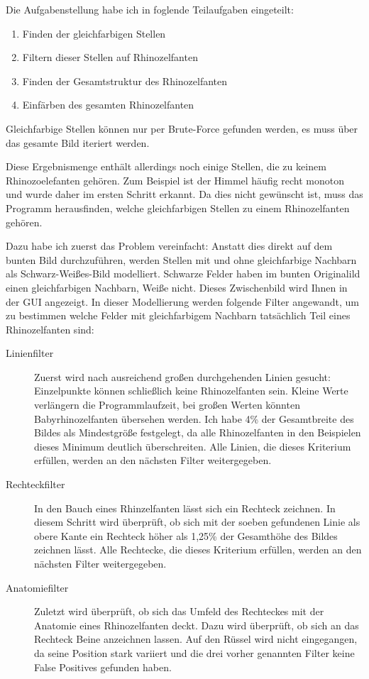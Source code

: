 Die Aufgabenstellung habe ich in foglende Teilaufgaben eingeteilt:
\begin{enumerate}
	\item Finden der gleichfarbigen Stellen
	\item Filtern dieser Stellen auf Rhinozelfanten
	\item Finden der Gesamtstruktur des Rhinozelfanten
	\item Einfärben des gesamten Rhinozelfanten
\end{enumerate}

Gleichfarbige Stellen können nur per Brute-Force gefunden werden, es muss über das gesamte Bild iteriert werden.

Diese Ergebnismenge enthält allerdings noch einige Stellen, die zu keinem Rhinozoelefanten gehören. Zum Beispiel ist der Himmel häufig recht monoton und wurde daher im ersten Schritt erkannt. Da dies nicht gewünscht ist, muss das Programm herausfinden, welche gleichfarbigen Stellen zu einem Rhinozelfanten gehören.

Dazu habe ich zuerst das Problem vereinfacht: Anstatt dies direkt auf dem bunten Bild durchzuführen, werden Stellen mit und ohne gleichfarbige Nachbarn als Schwarz-Weißes-Bild modelliert. Schwarze Felder haben im bunten Originalild einen gleichfarbigen Nachbarn, Weiße nicht. Dieses Zwischenbild wird Ihnen in der GUI angezeigt. In dieser Modellierung werden folgende Filter angewandt, um zu bestimmen welche Felder mit gleichfarbigem Nachbarn tatsächlich Teil eines Rhinozelfanten sind:

\begin{description}
	\item[Linienfilter] Zuerst wird nach ausreichend großen durchgehenden Linien gesucht: Einzelpunkte können schließlich keine Rhinozelfanten sein. Kleine Werte verlängern die Programmlaufzeit, bei großen Werten könnten Babyrhinozelfanten übersehen werden. Ich habe 4\% der Gesamtbreite des Bildes als Mindestgröße festgelegt, da alle Rhinozelfanten in den Beispielen dieses Minimum deutlich überschreiten. Alle Linien, die dieses Kriterium erfüllen, werden an den nächsten Filter weitergegeben.
	\item[Rechteckfilter] In den Bauch eines Rhinzelfanten lässt sich ein Rechteck zeichnen. In diesem Schritt wird überprüft, ob sich mit der soeben gefundenen Linie als obere Kante ein Rechteck höher als 1,25\% der Gesamthöhe des Bildes zeichnen lässt. Alle Rechtecke, die dieses Kriterium erfüllen, werden an den nächsten Filter weitergegeben.
	\item[Anatomiefilter] Zuletzt wird überprüft, ob sich das Umfeld des Rechteckes mit der Anatomie eines Rhinozelfanten deckt. Dazu wird überprüft, ob sich an das Rechteck Beine anzeichnen lassen. Auf den Rüssel wird nicht eingegangen, da seine Position stark variiert und die drei vorher genannten Filter keine False Positives gefunden haben.
\end{description}

